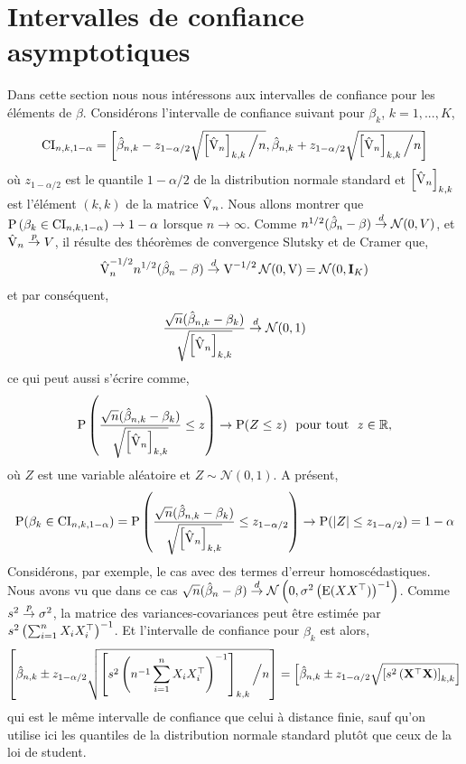 \section{Intervalles de confiance asymptotiques}
Dans cette section nous nous intéressons aux intervalles de confiance pour les éléments de $\beta$. Considérons l'intervalle de confiance suivant pour $\beta_k$, $k=1,...,K$,
\begin{align*}
\mathrm{CI}_{n, k, 1-\alpha} = \left[\hat{\beta}_{n, k} - z_{1-\alpha/2}\sqrt{\left[\hat{\operatorname{V}}_n\right]_{k,k} \Big{/} n}, 
\hat{\beta}_{n, k} + z_{1-\alpha/2}\sqrt{\left[\hat{\operatorname{V}}_n\right]_{k,k} \Big{/} n}\right]
\end{align*}
où $ z_{1-\alpha/2}$ est le quantile $1-\alpha/2$ de la distribution normale standard et $\left[\hat{\operatorname{V}}_n\right]_{k,k} $ est l'élément $(k, k)$ de la matrice $\hat{\operatorname{V}}_n$. Nous allons montrer que $\operatorname{P}\left(\beta_k \in \mathrm{CI}_{n, k, 1-\alpha} \right) \rightarrow 1 - \alpha$ lorsque $n\rightarrow \infty$. Comme $n^{1/2}(\hat{\beta}_n- \beta) \overset{d}{\rightarrow} \mathcal{N}(0, V)$, et $\hat{\operatorname{V}}_n \overset{p}{\rightarrow} V$, 
il résulte des théorèmes de convergence Slutsky et de Cramer que,
\begin{align*}
\hat{\operatorname{V}}_n^{-1/2} n^{1/2}(\hat{\beta}_n- \beta) \overset{d}{\rightarrow} \operatorname{V}^{-1/2}\mathcal{N}(0, \operatorname{V}) = \mathcal{N}(0, \mathbf{I}_K)
\end{align*}
et par conséquent,
\begin{align*}
\frac{\sqrt{n}(\hat{\beta}_{n, k} - \beta_k)}{\sqrt{\left[\hat{\operatorname{V}}_n\right]_{k,k} }} \overset{d}{\rightarrow} \mathcal{N}(0, 1)
\end{align*}
ce qui peut aussi s'écrire comme,
\begin{align*}
\operatorname{P}\left(\frac{\sqrt{n}(\hat{\beta}_{n,k} - \beta_k)}{\sqrt{\left[\hat{\operatorname{V}}_n\right]_{k,k} }} \leq z \right) \rightarrow \operatorname{P}(Z\leq z) \ \ \textrm{pour tout} \ \ z \in \mathbb{R},
\end{align*}
où $Z$ est une variable aléatoire et $Z \sim \mathcal{N}(0, 1)$. A présent,
\begin{align*}
\operatorname{P}(\beta_k \in \mathrm{CI}_{n, k, 1-\alpha} ) = \operatorname{P}\left(\frac{\sqrt{n}(\hat{\beta}_{n,k} - \beta_k)}{\sqrt{\left[\hat{\operatorname{V}}_n\right]_{k,k} }} \leq z_{1-\alpha/2} \right) \rightarrow \operatorname{P}(\left\vert {Z} \right\vert \leq z_{1-\alpha/2}  ) = 1 - \alpha
\end{align*}
Considérons, par exemple, le cas avec des termes d'erreur homoscédastiques.  Nous avons vu que dans ce cas $\sqrt{n}(\hat{\beta}_n- \beta) \overset{d}{\rightarrow} \mathcal{N}\left(0, \sigma^2\left(\operatorname{E}(XX^\top)\right)^{-1}\right)$. Comme $s^2 \overset{p}{\rightarrow} \sigma^2$, la matrice des variances-covariances peut être estimée par $s^2\left(\sum_{i=1}^n X_iX_i^\top\right)^{-1}$. Et l'intervalle de confiance pour $\beta_k$ est alors,
\begin{align*}
\left[\hat{\beta}_{n, k} \pm  z_{1 -  \alpha/2} \sqrt{ \left[s^2\left(n^{-1}\sum_{i=1}^n X_iX_i^\top\right)^{-1} \right]_{k,k} \Big{/} n}\right] = \left[\hat{\beta}_{n, k}  \pm z_{1-\alpha/2} \sqrt{\left[s^2\left(\mathbf{X}^\top\mathbf{X}\right)\right]_{k,k}}\right] 
\end{align*}
qui est le même intervalle de confiance que celui à distance finie, sauf qu'on utilise ici les quantiles de la distribution normale standard plutôt que ceux de la loi de student.

